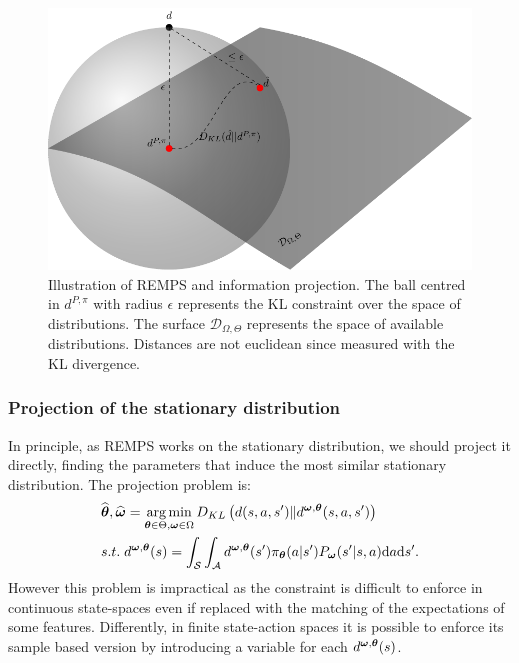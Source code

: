 \begin{figure}[tb!]
	\includegraphics{pictures/Information_projection}
	\caption{Illustration of REMPS and information projection. The ball centred in $d^{P,\pi}$ with radius $\epsilon$ represents the KL constraint over the space of distributions. The surface $\mathcal{D}_{\Omega , \Theta}$ represents the space of available distributions. Distances are not euclidean since measured with the KL divergence.}
\end{figure}

\subsubsection{Projection of the stationary distribution}
In principle, as REMPS works on the stationary distribution, we should project it directly, \ie finding the parameters that induce the most similar stationary distribution. The projection problem is:
\begin{align*}
	& \widehat{\bm{\mathbf{\theta}}}, \widehat{\bm{\mathbf{\omega}}} = \operatorname*{arg\,min}_{\bm{\mathbf{\theta}} \in \Theta, \bm{\mathbf{\omega}} \in \Omega} D_{KL} \left(d(s,a,s') \| d^{\bm{\mathbf{\omega}}, \bm{\mathbf{\theta}}}(s,a,s')\right)  \\
    & s.t. \; d^{\bm{\mathbf{\omega}}, \bm{\mathbf{\theta}}}(s) =\int_{\mathcal{S}} \int_{\mathcal{A}}d^{\bm{\mathbf{\omega}}, \bm{\mathbf{\theta}}}(s') \pi_{\bm{\mathbf{\theta}}}(a|s') P_{\bm{\mathbf{\omega}}}(s'|s,a) \mathrm{d}a \mathrm{d}s'.
\end{align*}
However this problem is impractical as the constraint is difficult to enforce in continuous state-spaces even if replaced with the matching of the expectations of some features. Differently, in finite state-action spaces it is possible to enforce its sample based version by introducing a variable for each $d^{\bm{\mathbf{\omega}}, \bm{\mathbf{\theta}}}(s)$.
